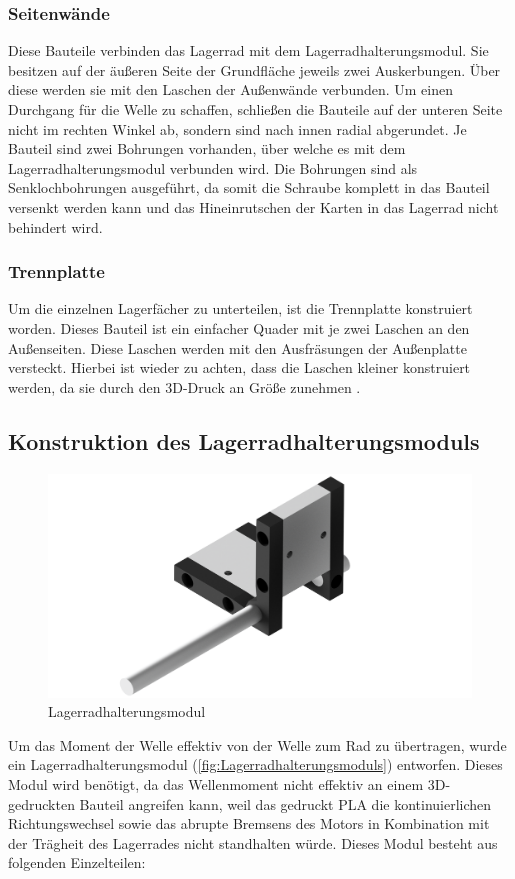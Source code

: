 \subsubsection{Seitenwände}
Diese Bauteile verbinden das Lagerrad mit dem Lagerradhalterungsmodul.
Sie besitzen auf der äußeren Seite der Grundfläche jeweils zwei Auskerbungen.
Über diese werden sie mit den Laschen der Außenwände verbunden.
Um einen Durchgang für die Welle zu schaffen, schließen die Bauteile auf der unteren Seite nicht im rechten Winkel ab, sondern sind nach innen radial abgerundet.
Je Bauteil sind zwei Bohrungen vorhanden, über welche es mit dem Lagerradhalterungsmodul verbunden wird.
Die Bohrungen sind als Senklochbohrungen ausgeführt, da somit die Schraube komplett in das Bauteil versenkt werden kann
und das Hineinrutschen der Karten in das Lagerrad nicht behindert wird.

\subsubsection{Trennplatte}
Um die einzelnen Lagerfächer zu unterteilen, ist die Trennplatte konstruiert worden.
Dieses Bauteil ist ein einfacher Quader mit je zwei Laschen an den Außenseiten.
Diese Laschen werden mit den Ausfräsungen der Außenplatte versteckt.
Hierbei ist wieder zu achten, dass die Laschen kleiner konstruiert werden, da sie durch den 3D-Druck an Größe zunehmen .

\subsection{Konstruktion des Lagerradhalterungsmoduls}
\begin{figure}
    \includegraphics[width=8 cm]{fig/mech/LagerRadGruppekomplett}
    \caption{Lagerradhalterungsmodul}
    \label{fig:Lagerradhalterungsmoduls}
\end{figure}
Um das Moment der Welle effektiv von der Welle zum Rad zu übertragen, wurde ein Lagerradhalterungsmodul (\autoref{fig:Lagerradhalterungsmoduls}) entworfen.
Dieses Modul wird benötigt, da das Wellenmoment nicht effektiv an einem 3D-gedruckten Bauteil angreifen kann, weil das gedruckt PLA
die kontinuierlichen Richtungswechsel sowie das abrupte Bremsens des Motors in Kombination mit der
Trägheit des Lagerrades nicht standhalten würde.
Dieses Modul besteht aus folgenden Einzelteilen:

